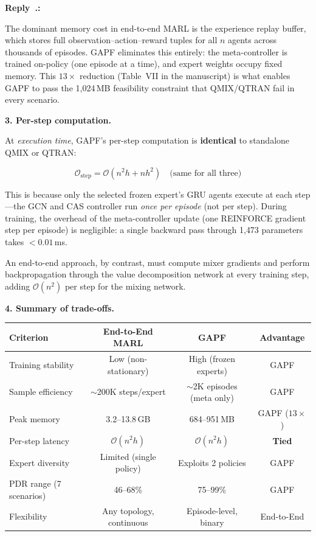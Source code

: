 \documentclass[11pt]{article}
\newcounter{reviewer}
\newcounter{replyctr}[reviewer]
\renewcommand{\thereplyctr}{\thereviewer.\arabic{replyctr}}
\newenvironment{reply}
  {\refstepcounter{replyctr}%
   \addtocounter{replyctr}{-1}%
   \medskip\noindent
   \begin{sf}\textbf{Reply~\thereplyctr:}\ }
  {\addtocounter{replyctr}{1}%
   \medskip\end{sf}}
\begin{document}
\begin{reply}
\begin{mdframed}[style=Resp]
\noindent The dominant memory cost in end-to-end MARL is the experience replay buffer, which stores full observation--action--reward tuples for all $n$ agents across thousands of episodes. GAPF eliminates this entirely: the meta-controller is trained on-policy (one episode at a time), and expert weights occupy fixed memory. This $13\times$ reduction (Table~VII in the manuscript) is what enables GAPF to pass the 1{,}024\,MB feasibility constraint that QMIX/QTRAN fail in every scenario.

\medskip
\noindent\textbf{3. Per-step computation.}

At \emph{execution time}, GAPF's per-step computation is \textbf{identical} to standalone QMIX or QTRAN:

\begin{equation*}
\mathcal{O}_{\text{step}} = \mathcal{O}(n^2 h + n h^2) \quad \text{(same for all three)}
\end{equation*}

\noindent This is because only the selected frozen expert's GRU agents execute at each step---the GCN and CAS controller run \emph{once per episode} (not per step). During training, the overhead of the meta-controller update (one REINFORCE gradient step per episode) is negligible: a single backward pass through 1{,}473 parameters takes $<0.01$\,ms.

An end-to-end approach, by contrast, must compute mixer gradients and perform backpropagation through the value decomposition network at every training step, adding $\mathcal{O}(n^2)$ per step for the mixing network.

\medskip
\noindent\textbf{4. Summary of trade-offs.}

\begin{center}
\begin{tabular}{lccc}
\toprule
\textbf{Criterion} & \textbf{End-to-End MARL} & \textbf{GAPF} & \textbf{Advantage} \\
\midrule
Training stability & Low (non-stationary) & High (frozen experts) & GAPF \\
Sample efficiency & $\sim$200K steps/expert & $\sim$2K episodes (meta only) & GAPF \\
Peak memory & 3.2--13.8\,GB & 684--951\,MB & GAPF ($13\times$) \\
Per-step latency & $\mathcal{O}(n^2 h)$ & $\mathcal{O}(n^2 h)$ & \textbf{Tied} \\
Expert diversity & Limited (single policy) & Exploits 2 policies & GAPF \\
PDR range (7 scenarios) & 46--68\% & 75--99\% & GAPF \\
\midrule
Flexibility & Any topology, continuous & Episode-level, binary & End-to-End \\
\bottomrule
\end{tabular}
\end{center}


\end{mdframed}
\end{reply}
\end{document}
